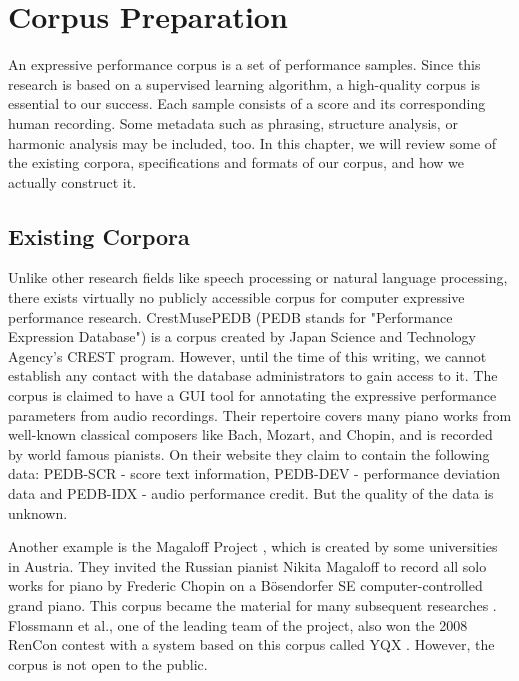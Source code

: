 \chapter{Corpus Preparation}
\label{chap:corpus}
  An expressive performance corpus is a set of performance samples. Since this research is based on a supervised learning algorithm, a high-quality corpus is essential to our success. Each sample consists of a score and its corresponding human recording. Some metadata such as phrasing, structure analysis, or harmonic analysis may be included, too. In this chapter, we will review some of the existing corpora, specifications and formats of our corpus, and how we actually construct it.

\section{Existing Corpora} 
Unlike other research fields like speech processing or natural language processing, there exists virtually no publicly accessible corpus for computer expressive performance research. CrestMusePEDB \cite{crestmuse} (PEDB stands for "Performance Expression Database") is a corpus created by Japan Science and Technology Agency's CREST program. However, until the time of this writing, we cannot establish any contact with the database administrators to gain access to it. The corpus is claimed to have a GUI tool for annotating the expressive performance parameters from audio recordings. Their repertoire covers many piano works from well-known classical composers like Bach, Mozart, and Chopin, and is recorded by world famous pianists. On their website \cite{crestmuse} they claim to contain the following data: PEDB-SCR - score text information, PEDB-DEV - performance deviation data and PEDB-IDX - audio performance credit. But the quality of the data is unknown.

Another example is the Magaloff Project \cite{magaloff}, which is created by some universities in Austria. They invited the Russian pianist Nikita Magaloff to record all solo works for piano by Frederic Chopin on a Bösendorfer SE computer-controlled grand piano. This corpus became the material for many subsequent researches \cite{Goebl2009, Grachten2011, Flossmann2009, Grachten2012, Flossmann2013, Flossman2011, Flossmann2010a}. Flossmann et al., one of the leading team of the project, also won the 2008 RenCon contest with a system based on this corpus called YQX \cite{yqx}. However, the corpus is not open to the public. 


